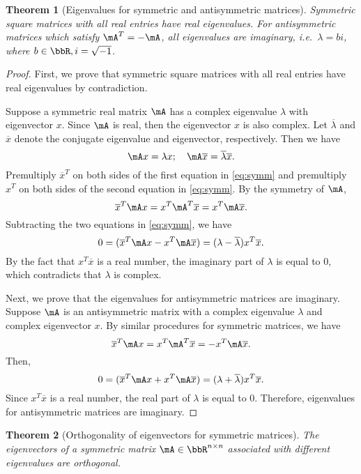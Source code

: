 \documentclass[11pt]{article}
\theoremstyle{plain}
\newtheorem{thm}{Theorem}[section]
\theoremstyle{definition}
\begin{document}
\begin{thm}[Eigenvalues for symmetric and antisymmetric matrices]\label{thm:symmeign}
	Symmetric square matrices  with all real entries have real eigenvalues. For antisymmetric matrices which satisfy $\mA^T = - \mA$, all eigenvalues are imaginary, i.e.\ $\lambda = b i$, where $b \in \bbR, i = \sqrt{-1}$.
\end{thm}
\begin{proof}
	First, we prove that symmetric square matrices with all real entries have real eigenvalues by contradiction. 
	
	Suppose a symmetric real matrix $\mA$ has a complex eigenvalue $\lambda$ with eigenvector $x$. Since $\mA$ is real, then the eigenvector $x$ is also complex. Let $\overline \lambda$ and $\overline x$ denote the conjugate eigenvalue and eigenvector, respectively. Then we have
	\begin{equation}\label{eq:symm}
		\mA x = \lambda x;\quad \mA \overline x = \overline \lambda \overline x.
	\end{equation} 
	Premultiply $\overline x^T$ on both sides of the first equation in \eqref{eq:symm} and premultiply $x^T$ on both sides of the second equation in \eqref{eq:symm}. By the symmetry of $\mA$,
	\[ \overline x^T \mA x  = x^T \mA^T \overline x = x^T \mA \overline x .\]
	Subtracting the two equations in \eqref{eq:symm}, we have
	\[  0 = ( \overline x^T \mA x -  x^T \mA \overline x ) = (\lambda - \overline \lambda) x^T \overline x.  \]
	By the fact that $x^T \overline x$ is a real number, the imaginary part of $\lambda$ is equal to 0, which contradicts that $\lambda$ is complex.
	
	Next, we prove that the eigenvalues for antisymmetric matrices are imaginary. 
	Suppose $\mA$ is an antisymmetric matrix with a complex eigenvalue $\lambda$ and complex eigenvector $x$.  By similar procedures for symmetric matrices, we have
	\[ \overline x^T \mA x  = x^T \mA^T \overline x  =  -x^T \mA \overline x .  \] 
	Then,
	\[  0 = ( \overline x^T \mA x +  x^T \mA \overline x ) = (\lambda + \overline \lambda) x^T \overline x.   \]
	Since $x^T \overline x$ is a real number, the real part of $\lambda$ is equal to 0. Therefore, eigenvalues for antisymmetric matrices are imaginary.
\end{proof}

\begin{thm}[Orthogonality of eigenvectors for symmetric matrices]\label{thm:symmortho}
The eigenvectors of a symmetric matrix $\mA \in \bbR^{n \times n}$ associated with different eigenvalues are orthogonal.
\end{thm}
\end{document}
